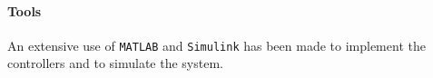 \paragraph{Tools}

An extensive use of \texttt{MATLAB} and \texttt{Simulink} has been made to implement the controllers and to simulate the system.
